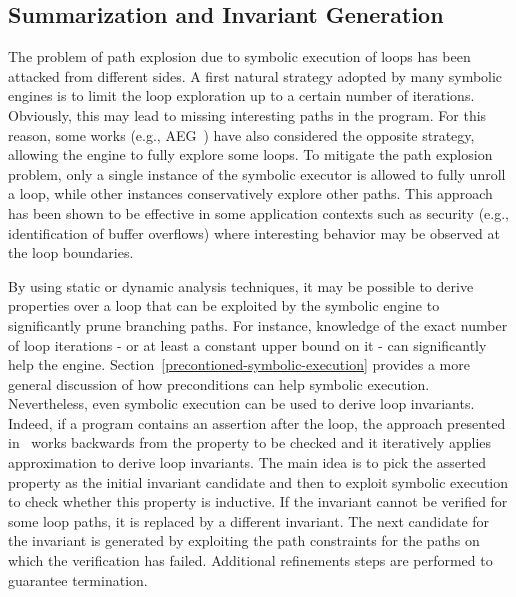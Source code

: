 \subsection{Summarization and Invariant Generation} 
\label{ss:summarization}

The problem of path explosion due to symbolic execution of loops has been attacked from different sides. A first natural strategy adopted by many symbolic engines is to limit the loop exploration up to a certain number of iterations. Obviously, this may lead to missing interesting paths in the program. For this reason, some works (e.g., {\sc AEG}~\cite{AEG-NDSS11}) have also considered the opposite strategy, allowing the engine to fully explore some loops. To mitigate the path explosion problem, only a single instance of the symbolic executor is allowed to fully unroll a loop, while other instances conservatively explore other paths. This approach has been shown to be effective in some application contexts such as security (e.g., identification of buffer overflows) where interesting behavior may be observed at the loop boundaries.

By using static or dynamic analysis techniques, it may be possible to derive properties over a loop that can be exploited by the symbolic engine to significantly prune branching paths. For instance, knowledge of the exact number of loop iterations - or at least a constant upper bound on it - can significantly help the engine. Section~\ref{precontioned-symbolic-execution} provides a more general discussion of how preconditions can help symbolic execution. Nevertheless, even symbolic execution can be used to derive loop invariants. Indeed, if a program contains an assertion after the loop, the approach presented in~\cite{PV-SPIN04} works backwards from the property to be checked and it iteratively applies approximation to derive loop invariants. The main idea is to pick the asserted property as the initial invariant candidate and then to exploit symbolic execution to check whether this property is inductive. If the invariant cannot be verified for some loop paths, it is replaced by a different invariant. The next candidate for the invariant is generated by exploiting the path constraints for the paths on which the verification has failed. Additional refinements steps are performed to guarantee termination.


